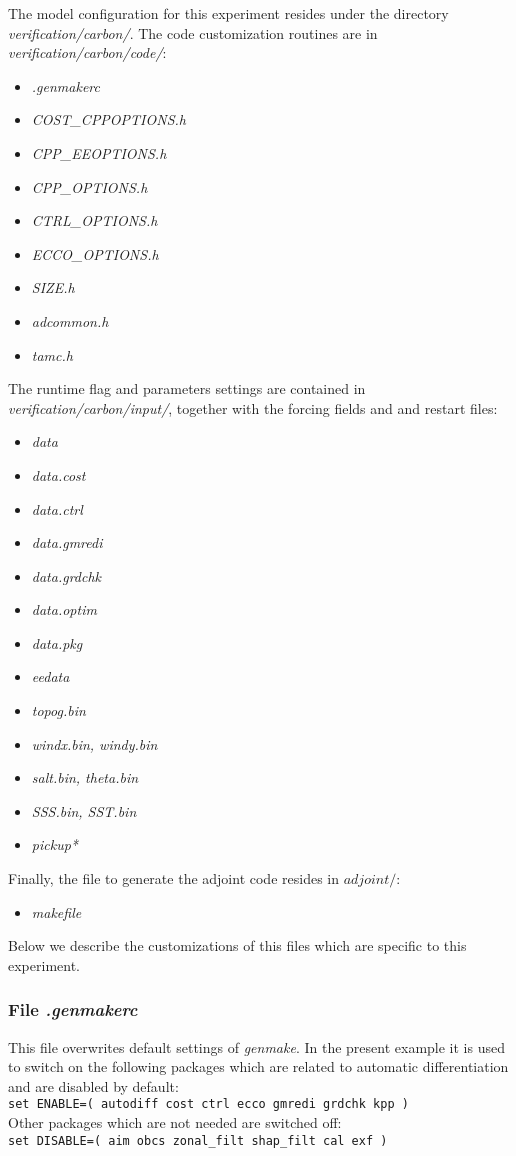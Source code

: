 The model configuration for this experiment resides under the
directory {\it verification/carbon/}.
The code customization routines are in {\it verification/carbon/code/}:
%
\begin{itemize}
%
\item {\it .genmakerc}
%
\item {\it COST\_CPPOPTIONS.h}
%
\item {\it CPP\_EEOPTIONS.h}
%
\item {\it CPP\_OPTIONS.h}
%
\item {\it CTRL\_OPTIONS.h}
%
\item {\it ECCO\_OPTIONS.h}
%
\item {\it SIZE.h}
%
\item {\it adcommon.h}
%
\item {\it tamc.h}
%
\end{itemize}
%
The runtime flag and parameters settings are contained in 
{\it verification/carbon/input/},
together with the forcing fields and and restart files:
%
\begin{itemize}
%
\item {\it data}
%
\item {\it data.cost}
%
\item {\it data.ctrl}
%
\item {\it data.gmredi}
%
\item {\it data.grdchk}
%
\item {\it data.optim}
%
\item {\it data.pkg}
%
\item {\it eedata}
%
\item {\it topog.bin}
%
\item {\it windx.bin, windy.bin}
%
\item {\it salt.bin, theta.bin}
%
\item {\it SSS.bin, SST.bin}
%
\item {\it pickup*}
%
\end{itemize}
%
Finally, the file to generate the adjoint code resides in
$ adjoint/ $:
%
\begin{itemize}
%
\item {\it makefile}
%
\end{itemize}
%

Below we describe the customizations of this files which are
specific to this experiment.

\subsubsection{File {\it .genmakerc}}
This file overwrites default settings of {\it genmake}.
In the present example it is used to switch on the following
packages which are related to automatic differentiation
and are disabled by default: \\
\hspace*{4ex} {\tt set ENABLE=( autodiff cost ctrl ecco gmredi grdchk kpp )}  \\
Other packages which are not needed are switched off: \\
\hspace*{4ex} {\tt set DISABLE=( aim obcs zonal\_filt shap\_filt cal exf )}

